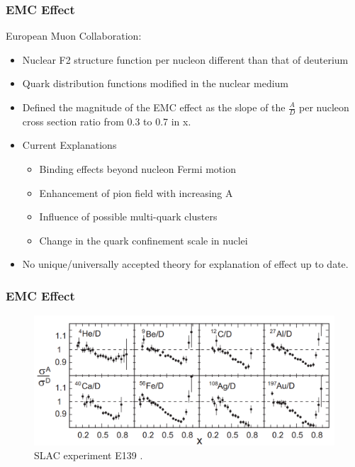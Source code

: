 \documentclass{beamer}
\begin{document}
\begin{frame}
\frametitle{EMC Effect}
	\begin{block}{}
		European Muon Collaboration:
			\begin{itemize}
				\item  Nuclear F2 structure function per nucleon different			than that of deuterium
				\item Quark distribution functions modified in the nuclear
				medium
				\item Defined the magnitude of the EMC effect as the slope of the $\frac{A}{D}$ per nucleon cross section ratio from 0.3 to 0.7 in x.
				\item Current Explanations
				\begin{itemize}
					\item Binding effects beyond nucleon Fermi motion
					\item Enhancement of pion field with increasing A
					\item Influence of possible multi-quark clusters
					\item Change in the quark confinement scale in nuclei
				\end{itemize}
				\item No unique/universally accepted theory for explanation
				of effect up to date. 
			\end{itemize}
		\end{block}

	
\end{frame}

\begin{frame}
\frametitle{EMC Effect}

	\begin{figure}
		\caption{\label{EMC_slac} SLAC experiment E139 \cite{slac_emc}.}
		\includegraphics[width =12cm]{../images/EMC_slac_horiz.png}
	\end{figure}
	

\end{frame}
\end{document}
